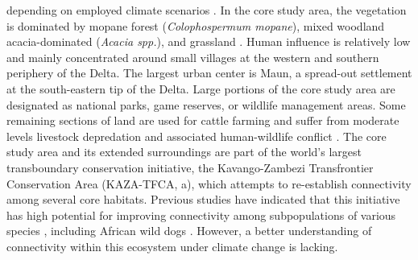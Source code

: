 \documentclass[abstract=on,10pt,a4paper,bibliography=totocnumbered]{article}
\begin{document}
depending on employed climate scenarios \citep{Kgathi.2006, Wolski.2008,
Hughes.2011, Wolski.2012, Moses.2018}. In the core study area, the vegetation is
dominated by mopane forest (\textit{Colophospermum mopane}), mixed woodland
acacia-dominated (\textit{Acacia spp.}), and grassland \citep{Mendelsohn.2010}.
Human influence is relatively low and mainly concentrated around small villages
at the western and southern periphery of the Delta. The largest urban center is
Maun, a spread-out settlement at the south-eastern tip of the Delta. Large
portions of the core study area are designated as national parks, game reserves,
or wildlife management areas. Some remaining sections of land are used for
cattle farming and suffer from moderate levels livestock depredation and
associated human-wildlife conflict \citep{Gusset.2009, McNutt.2017}. The core
study area and its extended surroundings are part of the world's largest
transboundary conservation initiative, the Kavango-Zambezi Transfrontier
Conservation Area (KAZA-TFCA, a), which attempts to re-establish
connectivity among several core habitats. Previous studies have indicated that
this initiative has high potential for improving connectivity among
subpopulations of various species \citep{Brennan.2020, Lines.2021}, including
African wild dogs \citep{Hofmann.2021}. However, a better understanding of
connectivity within this ecosystem under climate change is lacking.
\end{document}
